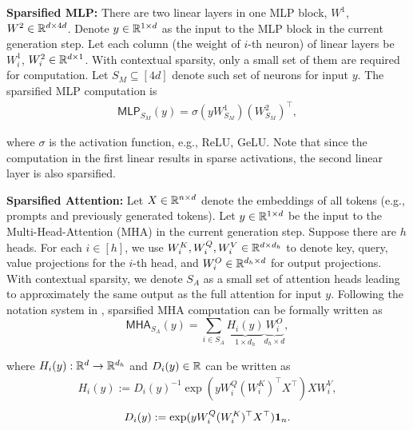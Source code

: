 \textbf{Sparsified MLP:} There are two linear layers in one MLP block, $W^1$, $W^2 \in \mathbb{R}^{ d \times 4d}$.  Denote $y\in \mathbb{R}^{1 \times d}$ as the input to the MLP block in the current generation step.
Let each column (the weight of $i$-th neuron) of linear layers be $W^{1}_{i}$, $W^{2}_{i}\in \mathbb{R}^{d\times 1}$. With contextual sparsity, only a small set of them are required for computation. Let  $S_M \subseteq [4d]$ denote such set of neurons for input $y$. The sparsified MLP computation is
\begin{align}\label{eq:MLP_S_y}
    \mathsf{MLP}_{S_M}(y) = \sigma( y W^{1}_{S_M} ) (W^{2}_{S_M})^{\top}, %
\end{align} 

where $\sigma$ is the activation function, e.g., ReLU, GeLU.  
Note that since the computation in the first linear results in sparse activations, the second linear layer is also sparsified.

\textbf{Sparsified  Attention:}  Let $X \in \mathbb{R}^{n \times d}$ denote the embeddings of all tokens (e.g., prompts and previously generated tokens). Let $y \in \mathbb{R}^{1 \times d}$ be the input to the Multi-Head-Attention (MHA) in the current generation step. Suppose there are $h$ heads. For each $i\in [h]$, we use $W^K_i, W^Q_i, W^V_i \in \mathbb{R}^{d \times d_h}$ to denote key, query, value projections for the $i$-th head, and $W_i^O \in \mathbb{R}^{d_h \times d}$ for output projections. With contextual sparsity, we denote $S_A$ as a small set of attention heads leading to approximately the same output as the full attention for input $y$.
Following the notation system in \cite{as23}, sparsified MHA computation can be formally written as 
\begin{equation*}
    \mathsf{MHA}_{S_A} (y) = \sum_{i\in S_A} \underbrace{ H_i(y) }_{1 \times d_h} \underbrace{ W^O_i }_{d_h \times d}, 
\end{equation*} 

where $H_i(y) : \mathbb{R}^{d} \rightarrow \mathbb{R}^{d_h}$ and $D_i(y) \in \mathbb{R}$ can be written as
\begin{align}\label{eq:H_i_y}
H_i(y) := D_i(y)^{-1} \exp( y W^Q_i (W^K_i)^\top X^\top ) X W^V_i,
\end{align}
\begin{align*}
D_i(y) :=  \exp( y W^Q_i (W^K_i)^\top X^\top ) {\bf 1}_n. 
\end{align*}

